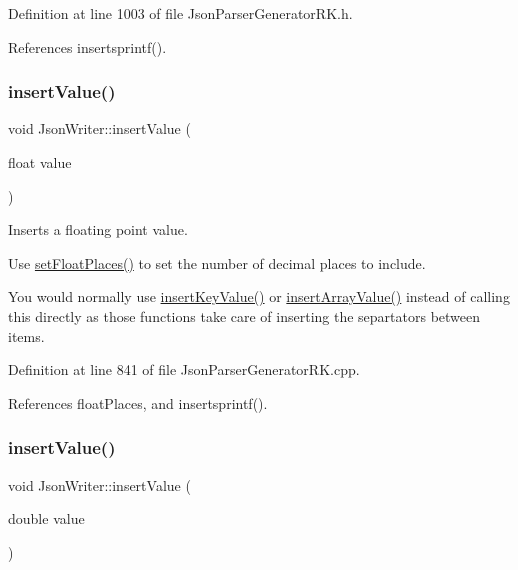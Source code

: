 Definition at line 1003 of file Json\+Parser\+Generator\+R\+K.\+h.



References insertsprintf().

\mbox{\label{class_json_writer_a5651b6c191da0397dab40c5ad51af1ec}} 
\subsubsection{\texorpdfstring{insert\+Value()}{insertValue()}\hspace{0.1cm}{\footnotesize\ttfamily [6/9]}}
{\footnotesize\ttfamily void Json\+Writer\+::insert\+Value (\begin{DoxyParamCaption}\item[{float}]{value }\end{DoxyParamCaption})}



Inserts a floating point value. 

Use \hyperlink{class_json_writer_aecd4d984a49fe59b0c4d892fe6d1e791}{set\+Float\+Places()} to set the number of decimal places to include.

You would normally use \hyperlink{class_json_writer_ac2de627389b59ce2c8ed95e10ea213bf}{insert\+Key\+Value()} or \hyperlink{class_json_writer_a8b4dc6726b66b4f277c7674e60c8a057}{insert\+Array\+Value()} instead of calling this directly as those functions take care of inserting the separtators between items. 

Definition at line 841 of file Json\+Parser\+Generator\+R\+K.\+cpp.



References float\+Places, and insertsprintf().

\mbox{\label{class_json_writer_a5ccac7627d96f545498118340f7e5f75}} 
\subsubsection{\texorpdfstring{insert\+Value()}{insertValue()}\hspace{0.1cm}{\footnotesize\ttfamily [7/9]}}
{\footnotesize\ttfamily void Json\+Writer\+::insert\+Value (\begin{DoxyParamCaption}\item[{double}]{value }\end{DoxyParamCaption})}



